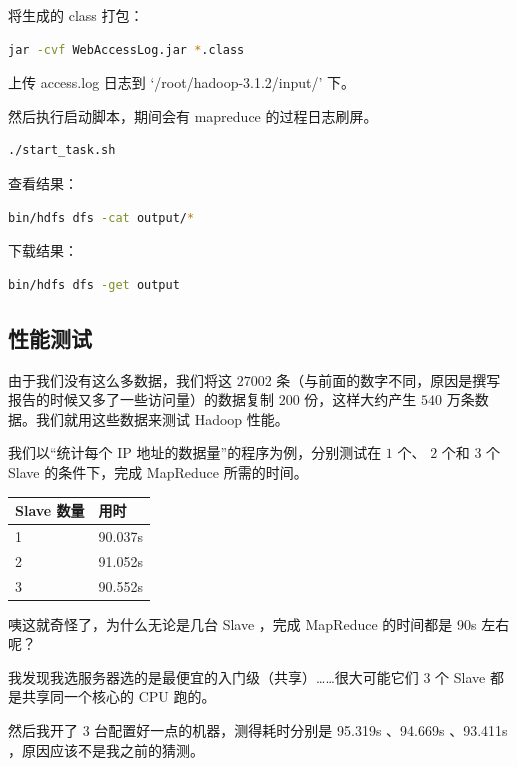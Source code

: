 \documentclass{article}
\begin{document}
将生成的 class 打包：

\begin{lstlisting}[language=bash]
jar -cvf WebAccessLog.jar *.class
\end{lstlisting}

上传 access.log 日志到 `/root/hadoop-3.1.2/input/' 下。

然后执行启动脚本，期间会有 mapreduce 的过程日志刷屏。

\begin{lstlisting}[language=bash]
./start_task.sh
\end{lstlisting}

查看结果：

\begin{lstlisting}[language=bash]
bin/hdfs dfs -cat output/*
\end{lstlisting}

下载结果：

\begin{lstlisting}[language=bash]
bin/hdfs dfs -get output
\end{lstlisting}

\subsection{性能测试}

由于我们没有这么多数据，我们将这 $27002$ 条（与前面的数字不同，原因是撰写报告的时候又多了一些访问量）的数据复制 $200$ 份，这样大约产生 $540$ 万条数据。我们就用这些数据来测试 Hadoop 性能。

我们以“统计每个 IP 地址的数据量”的程序为例，分别测试在 $1$ 个、 $2$ 个和 $3$ 个 Slave 的条件下，完成 MapReduce 所需的时间。

\begin{table}[!ht]
\centering
\begin{tabular}{|l|l|}
\hline
Slave 数量 & 用时 \\
\hline
1 & 90.037s \\
\hline
2 & 91.052s \\
\hline
3 & 90.552s \\
\hline
\end{tabular}
\end{table}

咦这就奇怪了，为什么无论是几台 Slave ，完成 MapReduce 的时间都是 90s 左右呢？

我发现我选服务器选的是最便宜的入门级（共享）……很大可能它们 $3$ 个 Slave 都是共享同一个核心的 CPU 跑的。

然后我开了 $3$ 台配置好一点的机器，测得耗时分别是 95.319s 、94.669s 、93.411s ，原因应该不是我之前的猜测。
\end{document}
